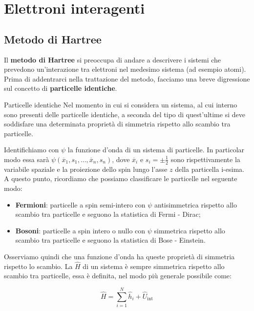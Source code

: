 
\chapter{Elettroni interagenti}


\section{Metodo di Hartree}
Il \textbf{metodo di Hartree} si preoccupa di andare a descrivere i sistemi che prevedono un'interazione tra elettroni nel medesimo sistema (ad esempio atomi). Prima di addentrarci nella trattazione del metodo, facciamo una breve digressione sul concetto di \textbf{particelle identiche}.

\begin{definition}{Particelle identiche}
    Nel momento in cui si considera un sistema, al cui interno sono presenti delle particelle identiche, a seconda del tipo di quest'ultime si deve soddisfare una determinata proprietà di simmetria rispetto allo scambio tra particelle.
\end{definition}

\noindent Identifichiamo con $\psi$ la funzione d'onda di un sistema di particelle. In particolar modo essa sarà $\psi(\overline{x}_1, s_1, \dots, \overline{x}_n, s_n)$, dove $\overline x_i$ e $s_i=\pm \frac 12$ sono rispettivamente la variabile spaziale e la proiezione dello spin lungo l'asse $z$ della particella i-esima. A questo punto, ricordiamo che possiamo classificare le particelle nel seguente modo:
\begin{itemize}
    \item \textbf{Fermioni}: particelle a spin semi-intero con $\psi$ antisimmetrica rispetto allo scambio tra particelle e seguono la statistica di Fermi - Dirac;
    \item \textbf{Bosoni}: particelle a spin intero o nullo con $\psi$ simmetrica rispetto allo scambio tra particelle e seguono la statistica di Bose - Einstein.
\end{itemize}

\noindent Osserviamo quindi che una funzione d'onda ha queste proprietà di simmetria rispetto lo scambio. La $\hat H$ di un sistema è sempre simmetrica rispetto allo scambio tra particelle, essa è definita, nel modo più generale possibile come:

\begin{equation*}
    \hat H = \sum_{i=1}^N \hat h_i + \hat U_{\text{int}}
\end{equation*}

